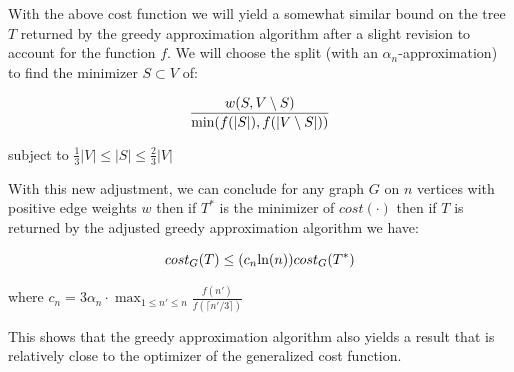 With the above cost function we will yield a somewhat similar bound on the tree $T$ returned by the greedy approximation algorithm after a slight revision to account for the function $f$. We will choose the split (with an $\alpha_n$-approximation) to find the minimizer $S \subset V$  of:

$$\frac{w(S, V \setminus S)}{\hbox{min}(f(|S|), f(|V \setminus S|))}$$

subject to $\frac{1}{3}|V| \leq |S| \leq \frac{2}{3}|V|$

\bigskip

With this new adjustment, we can conclude for any graph $G$ on $n$ vertices with positive edge weights $w$ then if $T^*$ is the minimizer of $cost(\cdot)$ then if $T$ is returned by the adjusted greedy approximation algorithm we have:

$$cost_G(T) \leq (c_n \hbox{ln}(n)) cost_G(T^*)$$

where $c_n = 3\alpha_n \cdot \max_{1 \leq n' \leq n}\frac{f(n')}{f(\lceil n'/3 \rceil)}$

\smallskip
This shows that the greedy approximation algorithm also yields a result that is relatively close to the optimizer of the generalized cost function.


